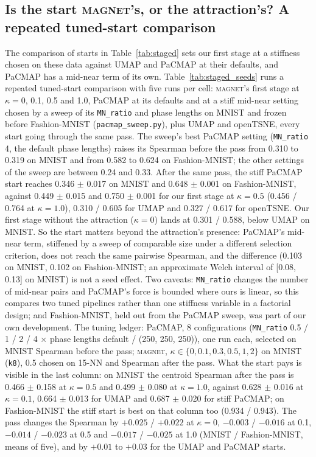 \documentclass[11pt]{article}
\newcommand{\magnet}{\textsc{magnet}}
\begin{document}
\subsection{Is the start \magnet{}'s, or the attraction's? A repeated tuned-start comparison}\label{sec:twobytwo}
The comparison of starts in Table~\ref{tab:staged} sets our first stage at a stiffness chosen on these
data against UMAP and PaCMAP at their defaults, and PaCMAP has a mid-near term of its own.
Table~\ref{tab:staged_seeds} runs a repeated tuned-start comparison with five runs per cell: \magnet{}'s first stage
at $\kappa = 0$, 0.1, 0.5 and 1.0, PaCMAP at its defaults and at a stiff mid-near setting chosen by a sweep of
its \texttt{MN\_ratio} and phase lengths on MNIST and frozen before Fashion-MNIST
(\texttt{pacmap\_sweep.py}), plus UMAP and openTSNE, every start going through the same pass.
The sweep's best PaCMAP setting (\texttt{MN\_ratio} 4, the default phase lengths) raises its
Spearman before the pass from 0.310 to 0.319 on MNIST and from 0.582 to 0.624 on Fashion-MNIST; the
other settings of the sweep are between 0.24 and 0.33. After the same pass, the stiff PaCMAP start
reaches 0.346 $\pm$ 0.017 on MNIST and 0.648 $\pm$ 0.001 on Fashion-MNIST, against 0.449 $\pm$ 0.015
and 0.750 $\pm$ 0.001 for our first stage at $\kappa = 0.5$ (0.456 / 0.764 at $\kappa = 1.0$), 0.310 / 0.605 for
UMAP and 0.327 / 0.617 for openTSNE. Our first stage without the attraction ($\kappa = 0$) lands at 0.301 /
0.588, below UMAP on MNIST. So the start matters beyond the attraction's presence: PaCMAP's mid-near
term, stiffened by a sweep of comparable size under a different selection criterion, does not reach
the same pairwise Spearman, and the
difference (0.103 on MNIST, 0.102 on Fashion-MNIST; an approximate Welch interval of [0.08, 0.13] on
MNIST) is not a seed effect. Two caveats: \texttt{MN\_ratio} changes the number of mid-near pairs and
PaCMAP's force is bounded where ours is linear, so this compares two tuned pipelines rather than one
stiffness variable in a factorial design; and Fashion-MNIST, held out from the PaCMAP sweep, was part
of our own development. The tuning ledger: PaCMAP, 8 configurations (\texttt{MN\_ratio} 0.5 / 1 / 2 / 4
$\times$ phase lengths default / (250, 250, 250)), one run each, selected on MNIST Spearman before the
pass; \magnet{}, $\kappa \in \{0, 0.1, 0.3, 0.5, 1, 2\}$ on MNIST (\texttt{k8}), 0.5 chosen on 15-NN and
Spearman after the pass. What the start pays is visible in the last column: on MNIST the centroid
Spearman after the pass is 0.466 $\pm$ 0.158 at $\kappa = 0.5$ and 0.499 $\pm$ 0.080 at $\kappa = 1.0$,
against 0.628 $\pm$ 0.016 at $\kappa = 0.1$, 0.664 $\pm$ 0.013 for UMAP and 0.687 $\pm$ 0.020 for stiff
PaCMAP; on Fashion-MNIST the stiff start is best on that column too (0.934 / 0.943). The pass changes
the Spearman by $+0.025$ / $+0.022$ at $\kappa = 0$, $-0.003$ / $-0.016$ at 0.1, $-0.014$ / $-0.023$ at
0.5 and $-0.017$ / $-0.025$ at 1.0 (MNIST / Fashion-MNIST, means of five), and by $+0.01$ to $+0.03$ for
the UMAP and PaCMAP starts.
\end{document}
